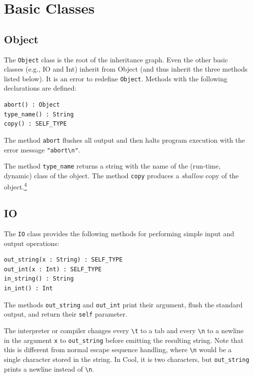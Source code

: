 \documentclass[]{article}
\begin{document}
\section{Basic Classes}

\subsection{Object}

The \texttt{Object} class is the root of the inheritance graph. Even the
other basic classes (e.g., IO and Int) inherit from Object (and thus
inherit the three methods listed below). It is an error to redefine
\texttt{Object}. Methods with the following declarations are defined:

\begin{verbatim}
abort() : Object
type_name() : String
copy() : SELF_TYPE
\end{verbatim}

The method \texttt{abort} flushes all output and then halts program
execution with the error message \texttt{"abort\textbackslash{}n"}.

The method \texttt{type\_name} returns a string with the name of the
(run-time, dynamic) class of the object. The method \texttt{copy}
produces a \emph{shallow} copy of the
object.\href{footnode.html\#foot715}{\textsuperscript{4}}


\subsection{IO}

The \texttt{IO} class provides the following methods for performing
simple input and output operations:

\begin{verbatim}
out_string(x : String) : SELF_TYPE
out_int(x : Int) : SELF_TYPE
in_string() : String
in_int() : Int
\end{verbatim}

The methods \texttt{out\_string} and \texttt{out\_int} print their
argument, flush the standard output, and return their \texttt{self}
parameter.

The interpreter or compiler changes every \texttt{\textbackslash{}t} to
a tab and every \texttt{\textbackslash{}n} to a newline in the argument
\texttt{x} to \texttt{out\_string} before emitting the resulting string.
Note that this is different from normal escape sequence handling, where
\texttt{\textbackslash{}n} would be a single character stored in the
string. In Cool, it is two characters, but \texttt{out\_string} prints a
newline instead of \texttt{\textbackslash{}n}.
\end{document}
